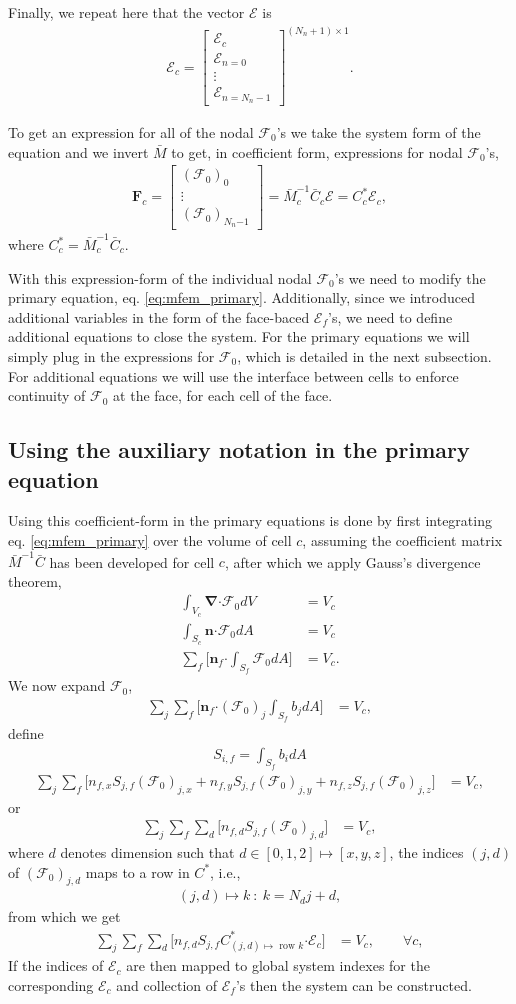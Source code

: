 \documentclass[10pt,letterpaper,notitlepage]{article}
\numberwithin{equation}{section}
\newcommand{\bnabla}{\boldsymbol{\nabla}}
\newcommand{\dotp}{\boldsymbol{\cdot}}
\newcommand{\RadE}{\mathcal{E}}
\newcommand{\RadF}{\boldsymbol{\mathcal{F}}}
\newcommand{\RadJ}{\RadF_0}
\newcommand{\beqn}{\begin{equation}\begin{aligned}}
\newcommand{\eeqn}{\end{aligned}\end{equation}}
\begin{document}
Finally, we repeat here that the vector $\boldsymbol{\RadE}$ is
\beqn 
\boldsymbol{\RadE}_c = 
\begin{bmatrix}
	\RadE_c \\
	\RadE_{n=0} \\
	\vdots \\
	\RadE_{n=N_n-1}
\end{bmatrix}^{(N_n+1){\times}1}.
\eeqn 

To get an expression for all of the nodal $\RadJ$'s we take the system form of the equation and we invert $\bar{M}$ to get, in coefficient form, expressions for nodal $\RadJ$'s,
\beqn 
\mathbf{F}_c =
\begin{bmatrix}
	(\RadJ)_0 \\ \vdots \\ (\RadJ)_{N_n{-1}}
\end{bmatrix}
 = \bar{M}_c^{-1} \bar{C}_c \boldsymbol{\RadE}
 = C_c^* \boldsymbol{\RadE}_c,
\eeqn 
where $C_c^* = \bar{M}_c^{-1} \bar{C}_c$. 

With this expression-form of the individual nodal $\RadJ$'s we need to modify the primary equation, eq. \eqref{eq:mfem_primary}. Additionally, since we introduced additional variables in the form of the face-baced $\RadE_f$'s,  we need to define additional equations to close the system. For the primary equations we will simply plug in the expressions for $\RadJ$, which is detailed in the next subsection. For additional equations we will use the interface between cells to enforce continuity of $\RadJ$ at the face, for each cell of the face.

\subsection{Using the auxiliary notation in the primary equation}
Using this coefficient-form in the primary equations is done by first integrating eq. \eqref{eq:mfem_primary} over the volume of cell $c$, assuming the coefficient matrix $\bar{M}^{-1} \bar{C}$ has been developed for cell $c$, after which we apply Gauss's divergence theorem,
\beqn 
\int_{V_c} \bnabla \dotp \RadJ dV &= V_c \\
\int_{S_c} \mathbf{n} \dotp \RadJ dA &= V_c \\
\sum_f \biggr[ \mathbf{n}_f \dotp \int_{S_f} \RadJ dA \biggr] &= V_c.
\eeqn 
We now expand $\RadJ$,
\beqn 
\sum_j \sum_f \biggr[ \mathbf{n}_f \dotp (\RadJ)_j \int_{S_f} b_j dA \biggr] &= V_c,
\eeqn 
define
\beqn 
S_{i,f} = \int_{S_f} b_i dA
\eeqn 
\beqn
\sum_j \sum_f \biggr[ 
n_{f,x} S_{j,f} (\RadJ)_{j,x} +
n_{f,y} S_{j,f} (\RadJ)_{j,y} +
n_{f,z} S_{j,f} (\RadJ)_{j,z}
\biggr] &= V_c,
\eeqn 
or
\beqn
\sum_j \sum_f \sum_d \biggr[ 
n_{f,d} S_{j,f} (\RadJ)_{j,d}
\biggr] &= V_c,
\eeqn 
where $d$ denotes dimension such that $d\in[0,1,2] \mapsto [x,y,z]$, the indices $(j,d)$ of $(\RadJ)_{j,d}$ maps to a row in $C^*$, i.e., 
\beqn 
(j,d) \mapsto k \ : \ k=N_d j + d,
\eeqn 
from which we get
\beqn
\sum_j \sum_f \sum_d \biggr[ 
n_{f,d} S_{j,f} C_{(j,d)\mapsto \text{ row } k}^* \dotp \boldsymbol{\RadE}_c
\biggr] &= V_c, \quad \quad \forall c,
\eeqn 
If the indices of $\RadE_c$ are then mapped to global system indexes for the corresponding $\RadE_c$ and collection of $\RadE_f$'s then the system can be constructed.
\end{document}
